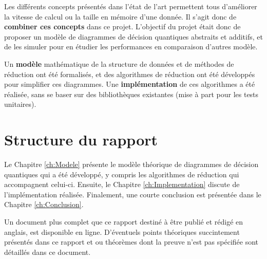 Les différents concepts présentés dans l'état de l'art permettent tous d'améliorer la vitesse de calcul ou la taille en mémoire d'une donnée. Il s'agit donc de \textbf{combiner ces concepts} dans ce projet. L'objectif du projet était donc de proposer un modèle de diagrammes de décision quantiques abstraits et additifs, et de les simuler pour en étudier les performances en comparaison d'autres modèle.

Un \textbf{modèle} mathématique de la structure de données et de méthodes de réduction ont été formalisés, et des algorithmes de réduction ont été développés pour simplifier ces diagrammes. Une \textbf{implémentation} de ces algorithmes a été réalisée, sans se baser sur des bibliothèques existantes (mise à part pour les tests unitaires).

\section{Structure du rapport}
\label{sec:Structure}

Le Chapitre \ref{ch:Modele} présente le modèle théorique de diagrammes de décision quantiques qui a été développé, y compris les algorithmes de réduction qui accompagnent celui-ci. Ensuite, le Chapitre \ref{ch:Implementation} discute de l'implémentation réalisée. Finalement, une courte conclusion est présentée dans le Chapitre \ref{ch:Conclusion}.

Un document plus complet que ce rapport destiné à être publié et rédigé en anglais, est disponible en ligne. \cite{Leroy_2024} D'éventuels points théoriques succintement présentés dans ce rapport et ou théorèmes dont la preuve n'est pas spécifiée sont détaillés dans ce document.

